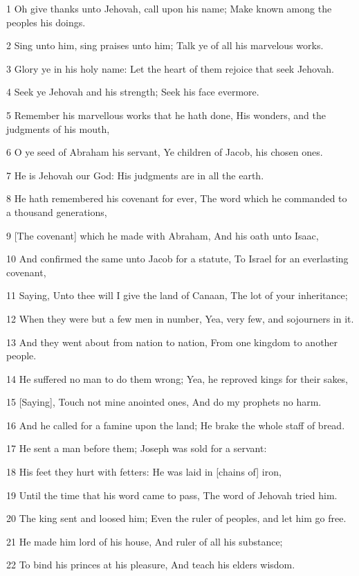 \par 1 Oh give thanks unto Jehovah, call upon his name; Make known among the peoples his doings.
\par 2 Sing unto him, sing praises unto him; Talk ye of all his marvelous works.
\par 3 Glory ye in his holy name: Let the heart of them rejoice that seek Jehovah.
\par 4 Seek ye Jehovah and his strength; Seek his face evermore.
\par 5 Remember his marvellous works that he hath done, His wonders, and the judgments of his mouth,
\par 6 O ye seed of Abraham his servant, Ye children of Jacob, his chosen ones.
\par 7 He is Jehovah our God: His judgments are in all the earth.
\par 8 He hath remembered his covenant for ever, The word which he commanded to a thousand generations,
\par 9 [The covenant] which he made with Abraham, And his oath unto Isaac,
\par 10 And confirmed the same unto Jacob for a statute, To Israel for an everlasting covenant,
\par 11 Saying, Unto thee will I give the land of Canaan, The lot of your inheritance;
\par 12 When they were but a few men in number, Yea, very few, and sojourners in it.
\par 13 And they went about from nation to nation, From one kingdom to another people.
\par 14 He suffered no man to do them wrong; Yea, he reproved kings for their sakes,
\par 15 [Saying], Touch not mine anointed ones, And do my prophets no harm.
\par 16 And he called for a famine upon the land; He brake the whole staff of bread.
\par 17 He sent a man before them; Joseph was sold for a servant:
\par 18 His feet they hurt with fetters: He was laid in [chains of] iron,
\par 19 Until the time that his word came to pass, The word of Jehovah tried him.
\par 20 The king sent and loosed him; Even the ruler of peoples, and let him go free.
\par 21 He made him lord of his house, And ruler of all his substance;
\par 22 To bind his princes at his pleasure, And teach his elders wisdom.
